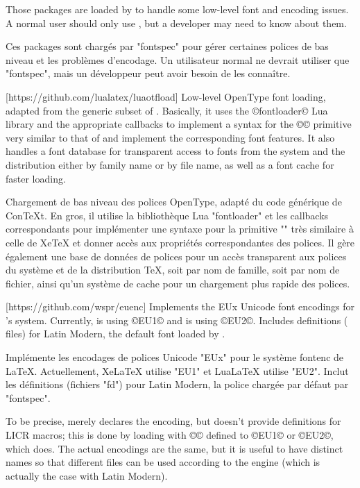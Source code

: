 \documentclass{lltxdoc}
\begin{document}
Those packages are loaded by  to handle some low-level font and
encoding issues. A normal user should only use , but a developer
may need to know about them.


Ces packages sont chargés par "fontspec" pour gérer certaines polices de bas niveau et les problèmes d'encodage. Un utilisateur normal ne devrait utiliser que "fontspec", mais un développeur peut avoir besoin de les connaître.

[https://github.com/lualatex/luaotfload]
Low-level OpenType font loading, adapted from the generic subset of \context.
Basically, it uses the ©fontloader© Lua library and the appropriate callbacks
to implement a syntax for the ©\font© primitive very similar to that of \xetex
and implement the corresponding font features. It also handles a font database
for transparent access to fonts from the system and the \tex distribution
either by family name or by file name, as well as a font cache for faster
loading.

Chargement de bas niveau des polices OpenType, adapté du code générique de ConTeXt. En gros, il utilise la bibliothèque Lua "fontloader" et les callbacks correspondants pour implémenter une syntaxe pour la primitive "\font" très similaire à celle de XeTeX et donner accès aux propriétés correspondantes des polices. Il gère également une base de données de polices pour un accès transparent aux polices du système et de la distribution TeX, soit par nom de famille, soit par nom de fichier, ainsi qu'un système de cache pour un chargement plus rapide des polices.

[https://github.com/wspr/euenc]
Implements the EUx Unicode font encodings for \latex's  system.
Currently, \xelatex is using ©EU1© and \lualatex is using ©EU2©. Includes
definitions ( files) for Latin Modern, the default font loaded by
.

Implémente les encodages de polices Unicode "EUx" pour le système fontenc de LaTeX. Actuellement, XeLaTeX utilise "EU1" et LuaLaTeX utilise "EU2". Inclut les définitions (fichiers "fd") pour Latin Modern, la police chargée par défaut par "fontspec".

To be precise,  merely declares the encoding, but
doesn't provide definitions for LICR macros; this is done by loading
 with ©\UTFencname© defined to ©EU1© or ©EU2©, which
 does. The actual encodings are the same, but it is useful to
have distinct names so that different  files can be used according to
the engine (which is actually the case with Latin Modern).
\end{document}
